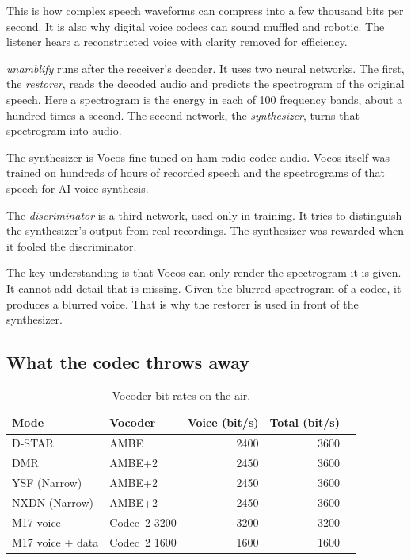 \documentclass[10pt,twocolumn,a4paper]{article}
\begin{document}
This is how complex speech waveforms can compress into a few thousand bits per second.
It is also why digital voice codecs can sound muffled and robotic.
The listener hears a reconstructed voice with clarity removed for efficiency.

\emph{unamblify} runs after the receiver's decoder. It uses two neural
networks. The first, the \emph{restorer}, reads the decoded audio and
predicts the spectrogram of the original speech. Here a spectrogram is
the energy in each of 100 frequency bands, about a hundred times a
second. The second network, the \emph{synthesizer}, turns that
spectrogram into audio.

The synthesizer is Vocos \cite{siuzdak2024vocos} fine-tuned on ham radio
codec audio.  Vocos itself was trained on
hundreds of hours of recorded speech and the spectrograms of that speech for AI voice synthesis.

The \emph{discriminator} is a third network, used only in training.  It
tries to distinguish the synthesizer's output from real recordings. The synthesizer was
rewarded when it fooled the discriminator.

The key understanding is that Vocos can only render the spectrogram it is given.
It cannot add detail that is missing. Given the blurred spectrogram of
a codec, it produces a blurred voice. That is why the restorer is used in front of
the synthesizer.

\subsection{What the codec throws away}

\begin{table}[t]
  \centering\footnotesize
  \setlength{\tabcolsep}{2pt}
  \caption{Vocoder bit rates on the air.}
  \label{tab:rates}
  \begin{tabular}{@{}llrrr@{}}
    \toprule
    Mode & Vocoder & Voice (bit/s) &  Total (bit/s) \\
    \midrule
    D-STAR            & AMBE          & 2400 & 3600 \\
    DMR               & AMBE+2        & 2450 & 3600 \\
    YSF (Narrow)      & AMBE+2        & 2450 & 3600 \\
    NXDN (Narrow)     & AMBE+2        & 2450 & 3600 \\
    M17 voice         & Codec~2 3200  & 3200 & 3200 \\
    M17 voice + data  & Codec~2 1600  & 1600 & 1600 \\
    \bottomrule
  \end{tabular}
\end{table}
\end{document}
